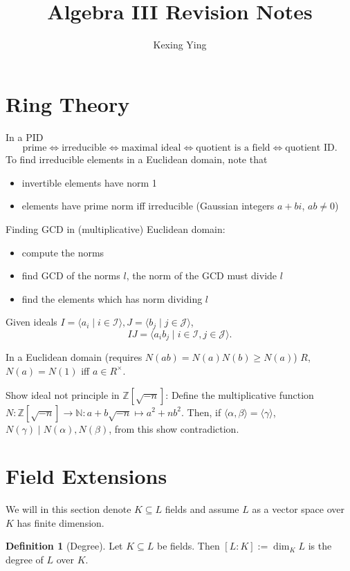 \documentclass[]{article}
\title{Algebra III Revision Notes}
\author{Kexing Ying}
\theoremstyle{definition}
\newtheorem*{definition}{Definition}
\begin{document}
\maketitle

\section*{Ring Theory}

In a PID
\[\text{prime} \iff \text{irreducible} \iff \text{maximal ideal} \iff \text{quotient is a field}
  \iff \text{quotient ID.}\]
To find irreducible elements in a Euclidean domain, note that
\begin{itemize}
  \item invertible elements have norm 1
  \item elements have prime norm iff irreducible (Gaussian integers \(a + bi\), \(ab \neq 0\))
\end{itemize}
Finding GCD in (multiplicative) Euclidean domain:
\begin{itemize}
  \item compute the norms
  \item find GCD of the norms \(l\), the norm of the GCD must divide \(l\)
  \item find the elements which has norm dividing \(l\)
\end{itemize}
Given ideals \(I = \langle a_i \mid i \in \mathcal{I}\rangle, J = \langle b_j \mid j \in \mathcal{J}\rangle\),
\[IJ = \langle a_ib_j \mid i \in \mathcal{I}, j \in \mathcal{J}\rangle.\]

In a Euclidean domain (requires \(N(ab) = N(a)N(b) \ge N(a)\)) \(R\), \(N(a) = N(1)\) iff \(a \in R^\times\).

Show ideal not principle in \(\mathbb{Z}[\sqrt{-n}]\): Define the multiplicative function 
\(N : \mathbb{Z}[\sqrt{-n}] \to \mathbb{N} : a + b \sqrt{-n} \mapsto a^2 + n b^2\). Then,
if \(\langle \alpha, \beta \rangle = \langle \gamma \rangle\), \(N(\gamma) \mid N(\alpha), N(\beta)\),
from this show contradiction.

\section*{Field Extensions}

We will in this section denote \(K \subseteq L\) fields and assume \(L\) as a vector space 
over \(K\) has finite dimension.

\begin{definition}[Degree]
  Let \(K \subseteq L\) be fields. Then \([L : K] := \dim_K L\) is the degree of \(L\) over \(K\).
\end{definition}
\end{document}
